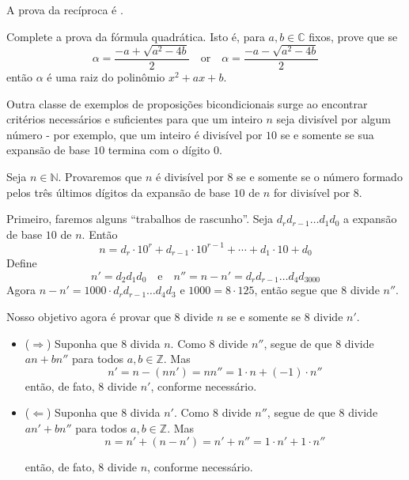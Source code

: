 \begin{itemizar}
\begin{cproof}
A prova da recíproca é .
\end{cproof}

\begin{exercise}
\label{exQuadraticFormulaConverse}
Complete a prova da fórmula quadrática. Isto é, para $a,b \in \mathbb{C}$ fixos, prove que se
\[
\alpha = \frac{-a+\sqrt{a^2-4b}}{2} \quad \text{or} \quad \alpha =\frac{-a-\sqrt{a^2-4b}}{2}
\]
então $\alpha$ é uma raiz do polinômio $x^2+ax+b$.
\end{exercise}

Outra classe de exemplos de proposições bicondicionais surge ao encontrar critérios necessários e suficientes para que um inteiro $n$ seja divisível por algum número - por exemplo, que um inteiro é divisível por $10$ se e somente se sua expansão de base $10$ termina com o dígito $0$.

\begin{example}
\label{exTestForDivisibilityByEight}
Seja $n \in \mathbb{N}$. Provaremos que $n$ é divisível por $8$ se e somente se o número formado pelos três últimos dígitos da expansão de base $10$ de $n$ for divisível por $8$.

Primeiro, faremos alguns “trabalhos de rascunho”. Seja $d_rd_{r-1}\dots{}d_1d_0$ a expansão de base $10$ de $n$. Então
\[
n = d_r \cdot 10^r + d_{r-1} \cdot 10^{r-1} + \cdots + d_1 \cdot 10 + d_0
\]
Define
\[
n' = d_2d_1d_0 \quad \text{e} \quad n'' = n-n' = d_rd_{r-1}\dots{}d_4d_3000
\]
Agora $n-n' = 1000 \cdot d_rd_{r-1} \dots d_4d_3$ e $1000 = 8 \cdot 125$, então segue que $8$ divide $n''$.

Nosso objetivo agora é provar que $8$ divide $n$ se e somente se $8$ divide $n'$.
\begin{itemize}
\item ($\Rightarrow$) Suponha que $8$ divida $n$. Como $8$ divide $n''$, segue de  que $8$ divide $an+bn''$ para todos $a,b \in \mathbb{Z}$. Mas
\[
n' = n-(nn') = nn'' = 1 \cdot n + (-1) \cdot n''
\]
então, de fato, $8$ divide $n'$, conforme necessário.
\item ($\Leftarrow$)  Suponha que $8$ divida $n'$. Como $8$ divide $n''$, segue de  que $8$ divide $an'+bn''$ para todos $a,b \in \mathbb{Z}$. Mas
\[
n = n'+(n-n') = n'+n'' = 1 \cdot n' + 1 \cdot n''
\]

então, de fato, $8$ divide $n$, conforme necessário.
\end{itemize}
\end{example}


\end{itemizar}
